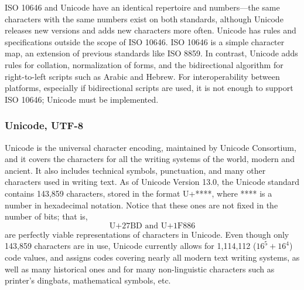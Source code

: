 \documentclass{article}
\begin{document}
  ISO 10646 and Unicode have an identical repertoire and numbers—the same characters with the same numbers exist on both standards, although Unicode releases new versions and adds new characters more often. Unicode has rules and specifications outside the scope of ISO 10646. ISO 10646 is a simple character map, an extension of previous standards like ISO 8859. In contrast, Unicode adds rules for collation, normalization of forms, and the bidirectional algorithm for right-to-left scripts such as Arabic and Hebrew. For interoperability between platforms, especially if bidirectional scripts are used, it is not enough to support ISO 10646; Unicode must be implemented.


  \subsubsection{Unicode, UTF-8}
  Unicode is the universal character encoding, maintained by Unicode Consortium, and it covers the characters for all the writing systems of the world, modern and ancient. It also includes technical symbols, punctuation, and many other characters used in writing text. As of Unicode Version 13.0, the Unicode standard contains 143,859 characters, stored in the format U+****, where **** is a number in hexadecimal notation. Notice that these ones are not fixed in the number of bits; that is, 
  \[\text{U+27BD and U+1F886}\]
  are perfectly viable representations of characters in Unicode. Even though only 143,859 characters are in use, Unicode currently allows for 1,114,112 ($16^5 + 16^4$) code values, and assigns codes covering nearly all modern text writing systems, as well as many historical ones and for many non-linguistic characters such as printer's dingbats, mathematical symbols, etc.
\end{document}
